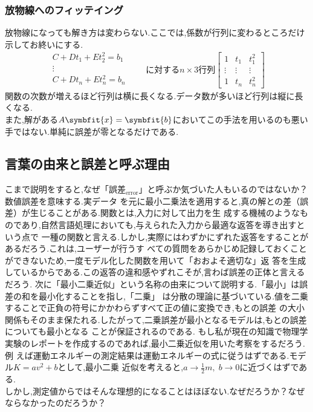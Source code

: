 \subsubsection{放物線へのフィッテイング}
放物線になっても解き方は変わらない.ここでは,係数が行列に変わるところだけ示してお終いにする.
\[
\begin{aligned}
    C+Dt_1+Et^2_2=b_1 \\
    \vdots \hspace{2cm} \\
    C+Dt_n+Et^2_n=b_n \\
\end{aligned}
\qquad\text{に対する}n\times3\text{行列}
\begin{bmatrix}
    1 & t_1 & t^2_1 \\ \vdots & \vdots & \vdots \\ 1 & t_n & t_n^2
\end{bmatrix}
\]
関数の次数が増えるほど行列は横に長くなる.データ数が多いほど行列は縦に長くなる.\\
また,解がある$A\symbfit{x}=\symbfit{b}$においてこの手法を用いるのも悪い手ではない.単純に誤差が零となるだけである.
\subsection{言葉の由来と誤差と呼ぶ理由}
こまで説明をすると,なぜ「誤差$_{\text{error}}$」と呼ぶか気づいた人もいるのではないか？数値誤差を意味する.実データ
を元に最小二乗法を適用すると,真の解との差（誤差）が生じることがある.関数とは,入力に対して出力を生
成する機械のようなものであり,自然言語処理においても,与えられた入力から最適な返答を導き出すという点で
一種の関数と言える.しかし,実際にはわずかにずれた返答をすることがあるだろう.これは,ユーザーが行うす
べての質問をあらかじめ記録しておくことができないため,一度モデル化した関数を用いて「おおよそ適切な」返
答を生成しているからである.この返答の違和感やずれこそが,言わば誤差の正体と言えるだろう.
次に「最小二乗近似」という名称の由来について説明する.「最小」は誤差の和を最小化することを指し,「二乗」
は分散の理論に基づいている.値を二乗することで正負の符号にかかわらずすべて正の値に変換でき,もとの誤差
の大小関係もそのまま保たれる.したがって,二乗誤差が最小となるモデルは,もとの誤差についても最小となる
ことが保証されるのである.
もし私が現在の知識で物理学実験のレポートを作成するのであれば,最小二乗近似を用いた考察をするだろう.例
えば運動エネルギーの測定結果は運動エネルギーの式に従うはずである.モデル$K=av^2+b$として,最小二乗
近似を考えると,$a\to\frac{1}{2}m,\;b\to0$に近づくはずである.\\
しかし,測定値からではそんな理想的になることはほぼない.なぜだろうか？なぜならなかったのだろうか？

